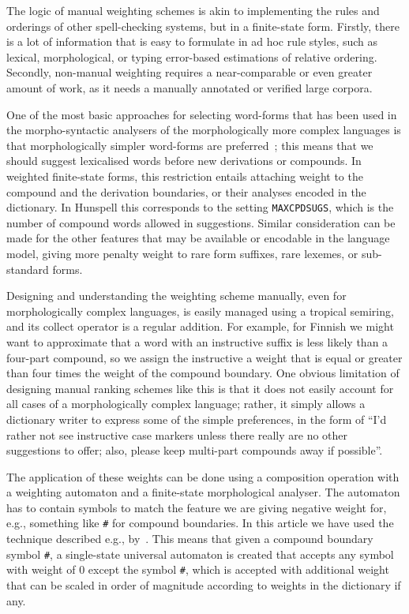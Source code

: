 \documentclass[a4paper,12pt]{article}
\begin{document}
The logic of manual weighting schemes is akin to implementing the rules and
orderings of other spell-checking systems, but in a finite-state form. Firstly, there is a lot of information that
is easy to formulate in ad hoc rule styles, such as lexical, morphological, or
typing error-based estimations of relative ordering. Secondly, non-manual
weighting requires a near-comparable or even greater amount of work, as it needs
a manually annotated or verified large corpora.

One of the most basic approaches for selecting word-forms that has been used in the
morpho-syntactic analysers of the morphologically more complex languages is
that morphologically simpler word-forms are
preferred~\cite[]{karlsson1992swetwol}; this means that we should suggest
lexicalised words before new derivations or compounds. In weighted
finite-state forms, this restriction entails attaching weight to the compound and the
derivation boundaries, or their analyses encoded in the dictionary.
In Hunspell this corresponds to the setting \texttt{MAXCPDSUGS}, which is
the number of compound words allowed in suggestions. Similar
consideration can be made for the other features that may be available or
encodable in the language model, giving more penalty weight to rare form
suffixes, rare lexemes, or sub-standard forms.

Designing and understanding the weighting scheme manually, even for
morphologically complex languages, is easily managed using a tropical
semiring, and its collect operator is a regular addition. For example, for
Finnish we might want to approximate that a word with an instructive suffix is less likely
than a four-part compound, so we assign the instructive a weight that is equal or
greater than four times the weight of the compound boundary. One obvious limitation
of designing manual ranking schemes like this is that it does not easily
account for all cases of a morphologically complex language; rather, it simply 
allows a dictionary writer to express some of the simple preferences, in the form
of  ``I'd rather not see instructive case markers unless there really are no other
suggestions to offer; also, please keep multi-part compounds away if possible''.

The application of these weights can be done using a composition operation with
a weighting automaton and a finite-state morphological analyser. The automaton
has to contain symbols to match the feature we are giving negative weight for,
e.g., something like \texttt{\#} for compound boundaries. In this article we have used the technique described e.g.,
by~\cite{linden/2009/fsmnlp}. This means that given a compound boundary symbol
\texttt{\#}, a single-state universal automaton is created that accepts any
symbol with weight of $0$ except the symbol \texttt{\#}, which is accepted with
additional weight that can be scaled in order of magnitude according to
weights in the dictionary if any.
\end{document}
